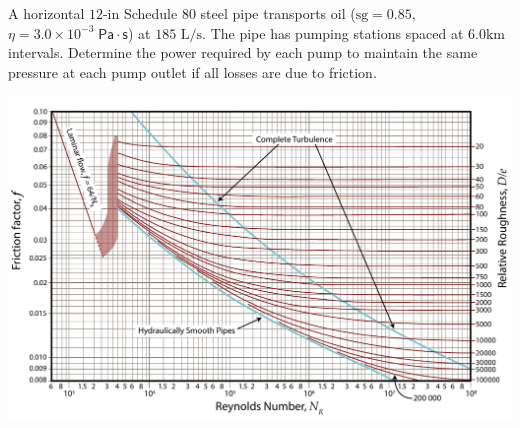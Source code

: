\documentclass[10pt]{amsart}
\begin{document}
\begin{multicols}{2}
	A horizontal $12\text{-in}$ Schedule $80$ steel pipe transports oil ($\text{sg}=0.85$,
	$\eta=3.0\times10^{-3}\;\mathsf{Pa\cdot s}$) at $185\text{ L/s}$. The pipe has pumping stations spaced at $6.0\text{
	km}$ intervals. Determine the power required by each pump to maintain the same pressure at each pump outlet 
	if all losses are due to friction.
			
% 	
% 	
	\vfill\pagebreak
	
\end{multicols}

	\begin{center}
		\includegraphics[scale=1.2, angle=90]{../../figs/05FrictionLosses/moody.pdf}
	\end{center}
	
	
	
	
\end{document}
